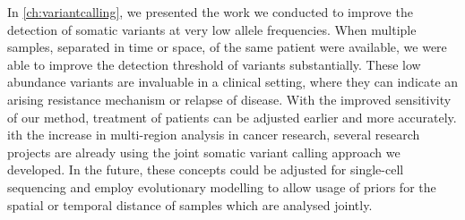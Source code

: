 In \autoref{ch:variantcalling}, we presented the work we conducted to improve the detection of somatic variants at very low allele frequencies. When multiple samples, separated in time or space, of the same patient were available, we were able to improve the detection threshold of variants substantially. These low abundance variants are invaluable in a clinical setting, where they can indicate an arising resistance mechanism or relapse of disease. With the improved sensitivity of our method,  treatment of patients can be adjusted earlier and more accurately. ith the increase in multi-region analysis in cancer research, several research projects are already using the joint somatic variant calling approach we developed. In the future, these concepts could be adjusted for  single-cell sequencing and  employ evolutionary modelling to allow usage of priors for the spatial or temporal distance of samples which are analysed jointly.

